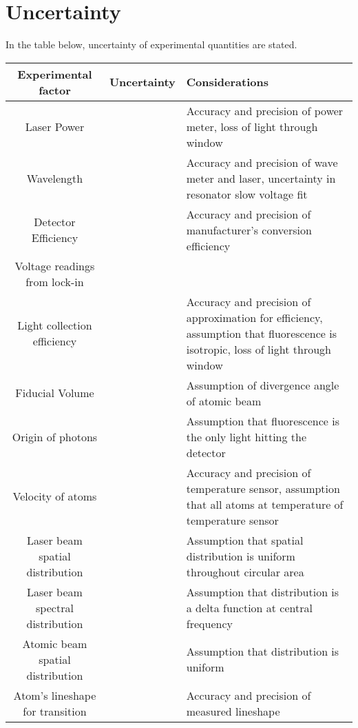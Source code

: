 \documentclass[12pt, a4paper]{article}
\begin{document}
\section{Uncertainty}
In the table below, uncertainty of experimental quantities are stated.
\begin{center}
\begin{tabular}{||c|c|p{8cm}||}
\hline
Experimental factor & Uncertainty & Considerations\\
\hline\hline
 Laser Power &  & Accuracy and precision of power meter, loss of light through window\\
\hline
 Wavelength &  & Accuracy and precision of wave meter and laser, uncertainty in resonator slow voltage fit\\
\hline
 Detector Efficiency &  & Accuracy and precision of manufacturer's conversion efficiency\\
\hline 
 Voltage readings from lock-in &  & \\
\hline
 Light collection efficiency &  & Accuracy and precision of approximation for efficiency, assumption that fluorescence is isotropic, loss of light through window\\
\hline
 Fiducial Volume &  & Assumption of divergence angle of atomic beam\\
\hline
 Origin of photons &  & Assumption that fluorescence is the only light hitting the detector\\
\hline
 Velocity of atoms &  & Accuracy and precision of temperature sensor, assumption that all atoms at temperature of temperature sensor \\
\hline
 Laser beam spatial distribution &  & Assumption that spatial distribution is uniform throughout circular area \\
\hline
 Laser beam spectral distribution &  & Assumption that distribution is a delta function at central frequency \\
\hline
 Atomic beam spatial distribution &  & Assumption that distribution is uniform\\
 \hline
 Atom's lineshape for transition &  & Accuracy and precision of measured lineshape \\
 \hline
\end{tabular}
\end{center}
\nocite{*}
{}

\end{document}
